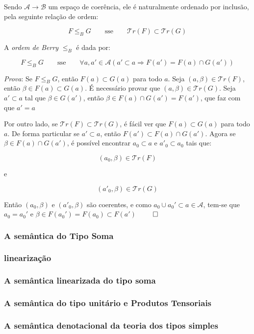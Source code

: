 \documentclass[../main.tex]{subfiles}
\begin{document}
Sendo $\mathcal{A} \to \mathcal{B}$ um espaço de coerência, ele é naturalmente ordenado por inclusão, pela seguinte relação de ordem:

$$F \leq_B G \qquad \text{sse} \qquad  \mathcal{T}r(F) \subset \mathcal{T}r(G)$$

\begin{proposition}
    A \emph{ordem de Berry} $\leq_B$ é dada por:

    $$F \leq_B G \qquad \text{sse} \qquad  \forall a, a' \in \mathcal{A} (a' \subset a \Rightarrow F(a') = F(a) \cap G(a'))$$
\end{proposition}

\emph{Prova}: Se $F \leq_B G$, então $F(a) \subset G(a)$ para todo $a$. Seja $(a, \beta) \in \mathcal{T}r(F)$, então $\beta \in F(a) \subset G(a)$. É necessário provar que $(a, \beta) \in \mathcal{T}r(G)$. Seja $a' \subset a$ tal que $\beta \in G(a')$, então $\beta \in F(a) \cap G(a') = F(a')$, que faz com que $a' = a$

Por outro lado, se $\mathcal{T}r(F) \subset \mathcal{T}r(G)$, é fácil ver que $F(a) \subset G(a)$ para todo $a$. De forma particular se $a' \subset a$, então $F(a') \subset F(a) \cap G(a')$. Agora se $\beta \in F(a) \cap G(a')$, é possível encontrar $a_0 \subset a$ e $a'_0 \subset a_0$ tais que:

$$(a_0, \beta) \in \mathcal{T}r(F)$$

e

$$(a'_0, \beta) \in \mathcal{T}r(G)$$

Então $(a_0, \beta)$ e $(a'_0, \beta)$ são coerentes, e como $a_0 \cup a_0' \subset a \in \mathcal{A}$, tem-se que $a_0 = a_0'$ e $\beta \in F(a_0') = F(a_0) \subset F(a')$ $\qed$


\subsubsection{A semântica do Tipo Soma}

\subsubsection{linearização}

\subsubsection{A semântica linearizada do tipo soma}

\subsubsection{A semântica do tipo unitário e Produtos Tensoriais}

\subsubsection{A semântica denotacional da teoria dos tipos simples}
\end{document}
